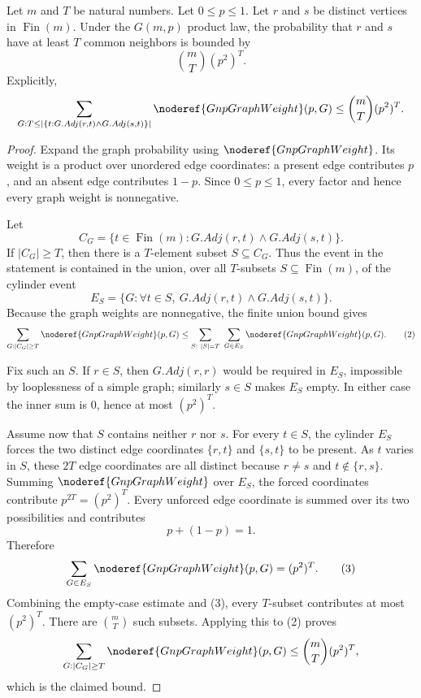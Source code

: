 \begin{helper}[GnpCodegreeBound]
\label{helper:GnpCodegreeBound}
Let \(m\) and \(T\) be natural numbers. Let \(0 \le p \le 1\).
Let \(r\) and \(s\) be distinct vertices in \(\operatorname{Fin}(m)\).
Under the \(G(m,p)\) product law, the probability that \(r\) and \(s\) have at least \(T\) common neighbors is bounded by
\[
\binom{m}{T} (p^2)^T.
\]
Explicitly,
\[
\sum_{G : T \le |\{t : G.Adj(r,t) \land G.Adj(s,t)\}|} \noderef{GnpGraphWeight}(p, G) \le \binom{m}{T} (p^2)^T.
\]
\end{helper}

\begin{proof}
Expand the graph probability using \(\noderef{GnpGraphWeight}\).  Its weight
is a product over unordered edge coordinates: a present edge contributes
\(p\), and an absent edge contributes \(1-p\).  Since \(0\le p\le1\), every
factor and hence every graph weight is nonnegative.

Let
\[
C_G=\{t\in\operatorname{Fin}(m):G.Adj(r,t)\land G.Adj(s,t)\}.
\]
If \(|C_G|\ge T\), then there is a \(T\)-element subset
\(S\subseteq C_G\).  Thus the event in the statement is contained in the
union, over all \(T\)-subsets \(S\subseteq\operatorname{Fin}(m)\), of the
cylinder event
\[
E_S=\{G:\forall t\in S,\ G.Adj(r,t)\land G.Adj(s,t)\}.
\tag{1}
\]
Because the graph weights are nonnegative, the finite union bound gives
\[
\sum_{G:|C_G|\ge T}\noderef{GnpGraphWeight}(p,G)
\le
\sum_{S:\ |S|=T}\ \sum_{G\in E_S}\noderef{GnpGraphWeight}(p,G).
\tag{2}
\]

Fix such an \(S\).  If \(r\in S\), then \(G.Adj(r,r)\) would be required in
\(E_S\), impossible by looplessness of a simple graph; similarly \(s\in S\)
makes \(E_S\) empty.  In either case the inner sum is \(0\), hence at most
\((p^2)^T\).

Assume now that \(S\) contains neither \(r\) nor \(s\).  For every \(t\in S\),
the cylinder \(E_S\) forces the two distinct edge coordinates
\(\{r,t\}\) and \(\{s,t\}\) to be present.  As \(t\) varies in \(S\), these
\(2T\) edge coordinates are all distinct because \(r\ne s\) and
\(t\notin\{r,s\}\).  Summing \(\noderef{GnpGraphWeight}\) over \(E_S\), the
forced coordinates contribute \(p^{2T}=(p^2)^T\).  Every unforced edge
coordinate is summed over its two possibilities and contributes
\[
p+(1-p)=1.
\]
Therefore
\[
\sum_{G\in E_S}\noderef{GnpGraphWeight}(p,G)=(p^2)^T.
\tag{3}
\]
Combining the empty-case estimate and (3), every \(T\)-subset contributes at
most \((p^2)^T\).  There are \(\binom mT\) such subsets.  Applying this to
(2) proves
\[
\sum_{G:|C_G|\ge T}\noderef{GnpGraphWeight}(p,G)
\le
\binom mT(p^2)^T,
\]
which is the claimed bound.
\end{proof}
